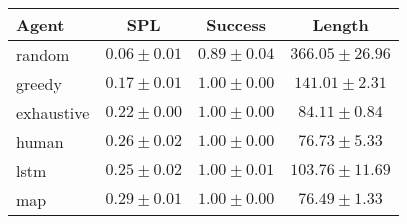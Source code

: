 \begin{tabular}{lccc}
    \toprule
    Agent & SPL & Success & Length \\
    \midrule
    random & $0.06 \pm 0.01$ & $0.89 \pm 0.04$ & $366.05 \pm 26.96$\\
    greedy & $0.17 \pm 0.01$ & $1.00 \pm 0.00$ & $141.01 \pm 2.31$\\
    exhaustive & $0.22 \pm 0.00$ & $1.00 \pm 0.00$ & $84.11 \pm 0.84$\\
    human & $0.26 \pm 0.02$ & $1.00 \pm 0.00$ & $76.73 \pm 5.33$\\
    lstm & $0.25 \pm 0.02$ & $1.00 \pm 0.01$ & $103.76 \pm 11.69$\\
    map & $0.29 \pm 0.01$ & $1.00 \pm 0.00$ & $76.49 \pm 1.33$\\
    \bottomrule
\end{tabular}